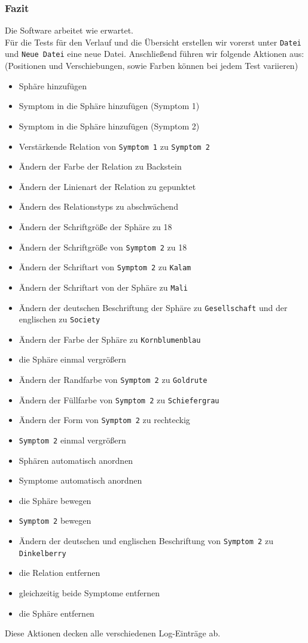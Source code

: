\documentclass[enabledeprecatedfontcommands]{scrartcl}
\begin{document}
\subsubsection{Fazit}
Die Software arbeitet wie erwartet. \\
\newpage
Für die Tests für den Verlauf und die Übersicht erstellen wir vorerst unter \texttt{Datei} und \texttt{Neue Datei} eine neue Datei. Anschließend führen wir folgende Aktionen aus: (Positionen und Verschiebungen, sowie Farben können bei jedem Test variieren)\\
\begin{itemize}  
\item Sphäre hinzufügen
\item Symptom in die Sphäre hinzufügen (Symptom 1) 
\item Symptom in die Sphäre hinzufügen (Symptom 2)
\item Verstärkende Relation von \texttt{Symptom 1} zu \texttt{Symptom 2}
\item Ändern der Farbe der Relation zu Backstein
\item Ändern der Linienart der Relation zu gepunktet 
\item Ändern des Relationstyps zu abschwächend 
\item Ändern der Schriftgröße der Sphäre zu 18
\item Ändern der Schriftgröße von \texttt{Symptom 2} zu 18
\item Ändern der Schriftart von \texttt{Symptom 2} zu \texttt{Kalam}
\item Ändern der Schriftart von der Sphäre zu \texttt{Mali}
\item Ändern der deutschen Beschriftung der Sphäre zu \texttt{Gesellschaft} und der englischen zu \texttt{Society}
\item Ändern der Farbe der Sphäre zu \texttt{Kornblumenblau}
\item die Sphäre einmal vergrößern 
\item Ändern der Randfarbe von \texttt{Symptom 2} zu \texttt{Goldrute} 
\item Ändern der Füllfarbe von \texttt{Symptom 2} zu \texttt{Schiefergrau} 
\item Ändern der Form von \texttt{Symptom 2} zu rechteckig
\item \texttt{Symptom 2} einmal vergrößern
\item Sphären automatisch anordnen
\item Symptome automatisch anordnen
\item die Sphäre bewegen 
\item \texttt{Symptom 2} bewegen
\item Ändern der deutschen und englischen Beschriftung von \texttt{Symptom 2} zu \texttt{Dinkelberry}
\item die Relation entfernen
\item gleichzeitig beide Symptome entfernen
\item die Sphäre entfernen
\end{itemize}
Diese Aktionen decken alle verschiedenen Log-Einträge ab. 
\end{document}
